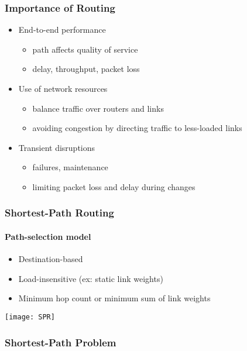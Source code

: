 \documentclass[../resumosRCOM.tex]{subfiles}
\begin{document}
\subsubsection{Importance of Routing}

\begin{itemize}
    \item End-to-end performance
    \begin{itemize}
        \item path affects quality of service
        \item delay, throughput, packet loss
    \end{itemize}
    \item Use of network resources
    \begin{itemize}
        \item balance traffic over routers and links
        \item avoiding congestion by directing traffic to less-loaded links
    \end{itemize}
    \item Transient disruptions
    \begin{itemize}
        \item failures, maintenance
        \item limiting packet loss and delay during changes
    \end{itemize}
\end{itemize}

\subsubsection{Shortest-Path Routing}

\paragraph{Path-selection model}

\begin{itemize}
    \item Destination-based
    \item Load-insensitive (ex: static link weights)
    \item Minimum hop count or minimum sum of link weights
\end{itemize}

\begin{center}
    \texttt{[image: SPR]}
\end{center}

\subsubsection{Shortest-Path Problem}
\end{document}
